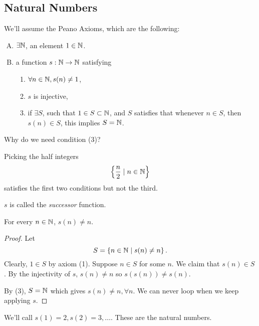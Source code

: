 \subsection{Natural Numbers}
We'll assume the Peano Axioms, which are the following:
\begin{enumerate}[A.]
    \item $\exists \mathbb N$, an element $1\in \mathbb N$.
    \item a function $s: \mathbb N\to \mathbb N$ satisfying
          \begin{enumerate}[(1)]
              \item $\forall n\in \mathbb N, s(n) \neq 1$,
              \item $s$ is injective,
              \item if $\exists S$, such that $1\in S\subset \mathbb N$, and $S$ satisfies that whenever $n\in S$, then $s(n)\in S$, this implies $S = \mathbb N$.
          \end{enumerate}
\end{enumerate}

Why do we need condition (3)?
\begin{example}
    Picking the half integers
    \[\left\{\frac{n}{2}\mid n\in \mathbb N\right\}\]
    satisfies the first two conditions but not the third.
\end{example}

$s$ is called the \emph{successor} function.

\begin{proposition}
    For every $n\in \mathbb N$, $s(n)\neq n$.
\end{proposition}
\begin{proof}
    Let
    \[S = \left\{ n\in \mathbb N\mid s(n) \neq n \right\}.\]
    Clearly, $1\in S$ by axiom (1). Suppose $n\in S$ for some $n$. We claim that $s(n)\in S$. By the injectivity of $s$, $s(n)\neq n$ so $s(s(n)) \neq s(n)$.

    By (3), $S = \mathbb N$ which gives $s(n)\neq n, \forall n$. We can never loop when we keep applying $s$.
\end{proof}
\begin{definition}
    We'll call $s(1) = 2, s(2) = 3, \dots$. These are the natural numbers.
\end{definition}
